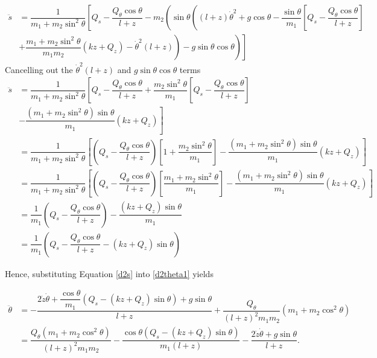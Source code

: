 \documentclass[12pt,a4paper,portrait]{article}
\begin{document}
	\begin{align*}
		\ddot{s} &= \dfrac{1}{m_1+m_2\sin^2{\theta}}\left[Q_s - \dfrac{Q_{\theta}\cos{\theta}}{l+z} - m_2\left(\sin{\theta}\left((l+z)\dot{\theta}^2+g\cos{\theta} - \dfrac{\sin{\theta}}{m_1}\left[Q_s - \dfrac{Q_{\theta}\cos{\theta}}{l+z} \right]\right.\right.\right.\\
		&\left.\left.\left.+\dfrac{m_1+m_2\sin^2{\theta}}{m_1m_2}\left(kz + Q_z\right)-\dot{\theta}^2(l+z)\right) - g\sin{\theta}\cos{\theta}\right)\right]
	\end{align*}
	Cancelling out the $\dot{\theta}^2(l+z)$ and $g\sin{\theta}\cos{\theta}$ terms
	\begin{align}
		\ddot{s} &= \dfrac{1}{m_1+m_2\sin^2{\theta}}\left[Q_s - \dfrac{Q_{\theta}\cos{\theta}}{l+z} +  \dfrac{m_2\sin^2{\theta}}{m_1}\left[Q_s - \dfrac{Q_{\theta}\cos{\theta}}{l+z} \right]\right.\nonumber\\
		&\left.-\dfrac{(m_1+m_2\sin^2{\theta})\sin{\theta}}{m_1}\left(kz + Q_z\right)\right]\nonumber\\
		&= \dfrac{1}{m_1+m_2\sin^2{\theta}}\left[\left(Q_s - \dfrac{Q_{\theta}\cos{\theta}}{l+z}\right)\left[1+\dfrac{m_2\sin^2{\theta}}{m_1}\right]-\dfrac{(m_1+m_2\sin^2{\theta})\sin{\theta}}{m_1}\left(kz + Q_z\right)\right]\nonumber\\
		&=  \dfrac{1}{m_1+m_2\sin^2{\theta}}\left[\left(Q_s - \dfrac{Q_{\theta}\cos{\theta}}{l+z}\right)\left[\dfrac{m_1+m_2\sin^2{\theta}}{m_1}\right]-\dfrac{(m_1+m_2\sin^2{\theta})\sin{\theta}}{m_1}\left(kz + Q_z\right)\right] \nonumber\\
		&= \dfrac{1}{m_1}\left(Q_s - \dfrac{Q_{\theta}\cos{\theta}}{l+z}\right) -\dfrac{(kz+Q_z)\sin{\theta}}{m_1} \nonumber\\
		&= \dfrac{1}{m_1}\left(Q_s - \dfrac{Q_{\theta}\cos{\theta}}{l+z}-(kz+Q_z)\sin{\theta}\right) \label{d2s}
	\end{align}
	
	Hence, substituting Equation \eqref{d2s} into \eqref{d2theta1} yields
	
	\begin{align*}
		\ddot{\theta} &= -\dfrac{2\dot{z}\dot{\theta}+\dfrac{\cos{\theta}}{m_1}\left(Q_s -(kz+Q_z)\sin{\theta}\right) + g\sin{\theta}}{l+z} + \dfrac{Q_{\theta}}{(l+z)^2m_1m_2}(m_1+m_2\cos^2{\theta})\\
		&= \dfrac{Q_{\theta}(m_1+m_2\cos^2{\theta})}{(l+z)^2m_1m_2} - \dfrac{\cos{\theta}(Q_s - (kz+Q_z)\sin{\theta})}{m_1(l+z)} - \dfrac{2\dot{z}\dot{\theta} + g\sin{\theta}}{l+z}.
	\end{align*}
\end{document}
